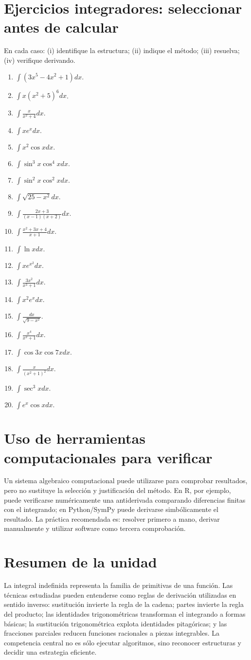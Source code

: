 \documentclass[12pt]{article}
\theoremstyle{definition}\newtheorem{definicion}[teorema]{Definición}\newtheorem{ejemplo}[teorema]{Ejemplo}\newtheorem{ejercicio}[teorema]{Ejercicio}
\theoremstyle{remark}\newtheorem*{observacion}{Observación}\newtheorem*{advertencia}{Advertencia}\newtheorem*{estrategia}{Estrategia}
\begin{document}
\section{Ejercicios integradores: seleccionar antes de calcular}
En cada caso: (i) identifique la estructura; (ii) indique el método; (iii) resuelva; (iv) verifique derivando.
\begin{enumerate}
\item $\int(3x^5-4x^2+1)dx$.
\item $\int x(x^2+5)^6dx$.
\item $\int\frac{x}{x^2+4}dx$.
\item $\int xe^xdx$.
\item $\int x^2\cos xdx$.
\item $\int\sin^3x\cos^4xdx$.
\item $\int\sin^2x\cos^2xdx$.
\item $\int\sqrt{25-x^2}dx$.
\item $\int\frac{2x+3}{(x-1)(x+2)}dx$.
\item $\int\frac{x^2+3x+4}{x+1}dx$.
\item $\int\ln xdx$.
\item $\int xe^{x^2}dx$.
\item $\int\frac{3x^2}{x^3+1}dx$.
\item $\int x^2e^xdx$.
\item $\int\frac{dx}{\sqrt{9-x^2}}$.
\item $\int\frac{x^4}{x^2+1}dx$.
\item $\int\cos3x\cos7xdx$.
\item $\int\frac{x}{(x^2+1)^2}dx$.
\item $\int\sec^3x dx$.
\item $\int e^x\cos xdx$.
\end{enumerate}

\section{Uso de herramientas computacionales para verificar}
Un sistema algebraico computacional puede utilizarse para comprobar resultados, pero no sustituye la selección y justificación del método. En R, por ejemplo, puede verificarse numéricamente una antiderivada comparando diferencias finitas con el integrando; en Python/SymPy puede derivarse simbólicamente el resultado. La práctica recomendada es: resolver primero a mano, derivar manualmente y utilizar software como tercera comprobación.

\section{Resumen de la unidad}
La integral indefinida representa la familia de primitivas de una función. Las técnicas estudiadas pueden entenderse como reglas de derivación utilizadas en sentido inverso: sustitución invierte la regla de la cadena; partes invierte la regla del producto; las identidades trigonométricas transforman el integrando a formas básicas; la sustitución trigonométrica explota identidades pitagóricas; y las fracciones parciales reducen funciones racionales a piezas integrables. La competencia central no es sólo ejecutar algoritmos, sino reconocer estructuras y decidir una estrategia eficiente.
\end{document}
